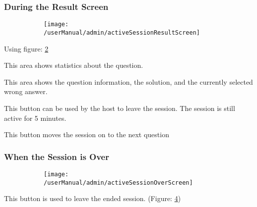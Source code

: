 \subsubsection{During the Result Screen}
\begin{figure}[H]
    \centering
    \begin{subfigure}{\linewidth}
        \texttt{[image: /userManual/admin/activeSessionResultScreen]}
       	\caption{}
		\label{fig:activeSessionResultScreen}	
    \end{subfigure}
\end{figure}
Using figure: \ref{fig:activeSessionResultScreen}
\begin{userManualItemlist}
    \item[1] This area shows statistics about the question.
    \item[2] This area shows the question information, the solution, and the currently selected wrong answer.
    \item[3] This button can be used by the host to leave the session. The session is still active for 5 minutes.
    \item[4] This button moves the session on to the next question  
\end{userManualItemlist}

\subsubsection{When the Session is Over}
\begin{figure}[H]
    \centering
    \begin{subfigure}{\linewidth}
        \texttt{[image: /userManual/admin/activeSessionOverScreen]}
       	\caption{}
		\label{fig:activeSessionOverScreen}	
    \end{subfigure}
\end{figure}
\begin{userManualItemlist}
    \item[1] This button is used to leave the ended session. (Figure: \ref{fig:activeSessionOverScreen})
\end{userManualItemlist}